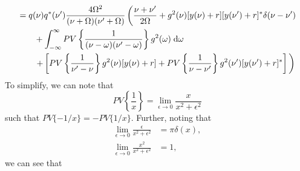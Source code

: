 \begin{equation}
\begin{split}
&= q(\nu)q^*(\nu')\frac{4\Omega^2}{(\nu + \Omega)(\nu' + \Omega)}\left(\frac{\nu + \nu'}{2\Omega} + g^2(\nu)[y(\nu) + r][y(\nu') + r]^*\delta(\nu - \nu') \vphantom{\int_0^\infty} \right.\\
&\qquad +  \int_{-\infty}^\infty PV\left\{\frac{1}{(\nu - \omega)(\nu' - \omega)}\right\}g^2(\omega)\;\mathrm{d}\omega\\
&\qquad\left. + \left[PV\left\{\frac{1}{\nu' - \nu}\right\}g^2(\nu)[y(\nu) + r] + PV\left\{\frac{1}{\nu - \nu'}\right\}g^2(\nu')[y(\nu') + r]^*\right] \vphantom{\int_0^\infty} \right)
\end{split}
\end{equation}
To simplify, we can note that
\begin{equation}
PV\left\{\frac{1}{x}\right\} = \lim_{\epsilon\to0}\frac{x}{x^2 + \epsilon^2}
\end{equation}
such that $PV\{-1/x\} = -PV\{1/x\}$. Further, noting that
\begin{equation}
\begin{split}
\lim_{\epsilon\to0}\frac{\epsilon}{x^2 + \epsilon^2} &= \pi\delta(x),\\
\lim_{\epsilon\to0}\frac{x^2}{x^2 + \epsilon^2} &= 1,
\end{split}
\end{equation}
we can see that
